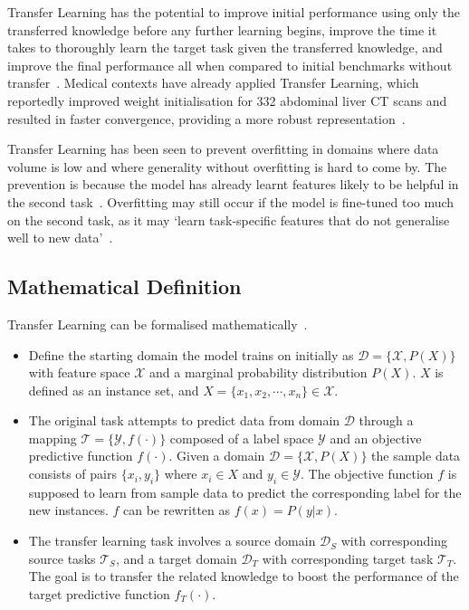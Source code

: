 \documentclass[11pt,twoside]{report}
\begin{document}
Transfer Learning has the potential to improve initial performance using only the transferred knowledge before any further learning begins, improve the time it takes to thoroughly learn the target task given the transferred knowledge, and improve the final performance all when compared to initial benchmarks without transfer~\cite{torrey-handbook}. Medical contexts have already applied Transfer Learning, which reportedly improved weight initialisation for 332 abdominal liver CT scans and resulted in faster convergence, providing a more robust representation~\cite{liver-lesion-via-transfer-learning}.

Transfer Learning has been seen to prevent overfitting in domains where data volume is low and where generality without overfitting is hard to come by. The prevention is because the model has already learnt features likely to be helpful in the second task~\cite{geeks-transfer-learning}. Overfitting may still occur if the model is fine-tuned too much on the second task, as it may `learn task-specific features that do not generalise well to new data'~\cite{geeks-transfer-learning}.

\subsection{Mathematical Definition}

Transfer Learning can be formalised mathematically~\cite{survey-on-transfer-learning, concise-review-of-transfer-learning}.

\begin{itemize}
  \item Define the starting domain the model trains on initially as $\mathcal{D} = \{\mathcal{X}, P(X)\}$ with feature space $\mathcal{X}$ and a marginal probability distribution $P(X)$. $X$ is defined as an instance set, and $X = \{x_1, x_2, \cdots, x_n\} \in \mathcal{X}$.
  
  \item The original task attempts to predict data from domain $\mathcal{D}$ through a mapping $\mathcal{T} = \{\mathcal{Y}, f(\cdot)\}$ composed of a label space $\mathcal{Y}$ and an objective predictive function $f(\cdot)$. Given a domain $\mathcal{D} = \{\mathcal{X}, P(X)\}$ the sample data consists of pairs $\{x_i, y_i\}$ where $x_i \in X$ and $y_i \in \mathcal{Y}$. The objective function $f$ is supposed to learn from sample data to predict the corresponding label for the new instances. $f$ can be rewritten as $f(x)=P(y|x)$.
  
  \item The transfer learning task involves a source domain $\mathcal{D}_S$ with corresponding source tasks $\mathcal{T}_S$, and a target domain $\mathcal{D}_T$ with corresponding target task $\mathcal{T}_T$. The goal is to transfer the related knowledge to boost the performance of the target predictive function $f_T(\cdot)$.
\end{itemize}
\end{document}
